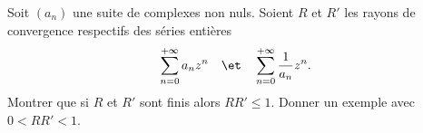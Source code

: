 \begin{enonce}
\begin{exercise}[ID={RMS126 E776},subtitle={Centrale PSI 2015},tags={}]
Soit $\left( a_n \right)$ une suite de complexes non nuls.
Soient $R$ et $R'$ les rayons de convergence respectifs des séries entières 
\begin{equation*}
  \sum_{n=0}^{+\infty} a_n z^n \quad\et\quad \sum_{n=0}^{+\infty} \frac1{a_n} z^n.
\end{equation*}
Montrer que si $R$ et $R'$ sont finis alors $RR'\leq 1$.
Donner un exemple avec $0<RR'<1$.
\end{exercise}
\begin{solution}
\end{solution}
\end{enonce}
